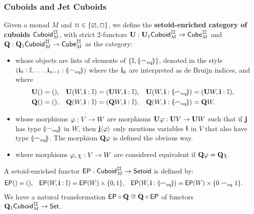 \documentclass[a4paper]{memoir}
\begin{document}
\subsubsection{Cuboids and Jet Cuboids}
\label{sec:cuboid}
\label{sec:jetcuboid}
\begin{definition}
	\label{def:cuboid}
	\label{def:cuboid-ep}
	Given a monad $M$ and $\mycubex \in \accol{\cartes, \affine}$, we define the \textbf{setoid-enriched category of cuboids $\cuboidcat^\mycubex_M$}, with strict 2-functors $\setoidfget : \setoidfget_1\cuboidcat^\mycubex_M \to \cubecat^\mycubex_M$ and $\setoidquot : \setoidquot_1\cuboidcat^\mycubex_M \to \cubecat^\mycubex_M$ as the category:
	\begin{itemize}
		\item whose objects are lists of elements of $\mathopen{}\left\{ {\mathbb I}, {\llparenthesis {\frown}_{\mathrm{eq}} \rrparenthesis} \right\}\mathclose{}$, denoted in the style $(\mathbf{i}_0 : {\mathbb I}, \ldots, \mathbf{i}_{n-1} : {\llparenthesis {\frown}_{\mathrm{eq}} \rrparenthesis})$ where the $\mathbf{i}_k$ are interpreted as de Bruijn indices, and where
		\begin{align*}
			{\mathbf{U}}() &= (), &
			{\mathbf{U}} (W, \mathbf{i} : {\mathbb I}) &= ({\mathbf{U}} W, \mathbf{i} : {\mathbb I}), &
			{\mathbf{U}} (W, \mathbf{i} : {\llparenthesis {\frown}_{\mathrm{eq}} \rrparenthesis}) &= ({\mathbf{U}} W, \mathbf{i} : {\mathbb I}),
			\\
			{\mathbf{Q}} () &= (), &
			{\mathbf{Q}} (W, \mathbf{i} : {\mathbb I}) &= ({\mathbf{Q}} W, \mathbf{i} : {\mathbb I}), &
			{\mathbf{Q}} (W, \mathbf{i} : {\llparenthesis {\frown}_{\mathrm{eq}} \rrparenthesis}) &= {\mathbf{Q}} W.
		\end{align*}
		\item whose morphisms $\varphi : V \to W$ are morphisms ${\mathbf{U}} \varphi : {\mathbf{U}} V \to {\mathbf{U}} W$ such that if $\mathbf{j}$ has type ${\llparenthesis {\frown}_{\mathrm{eq}} \rrparenthesis}$ in $W$, then $\mathbf{j} \langle \varphi \rangle$ only mentions variables $\mathbf{i}$ in $V$ that also have type ${\llparenthesis {\frown}_{\mathrm{eq}} \rrparenthesis}$.
		The morphism ${\mathbf{Q}} \varphi$ is defined the obvious way.
		\item where morphisms $\varphi, \chi : V \to W$ are considered equivalent if ${\mathbf{Q}} \varphi = {\mathbf{Q}} \chi$.
	\end{itemize}
	A setoid-enriched functor $\EP : \cuboidcat^\mycubex_M \to \Setoid$ is defined by:
	\begin{align*}
		\mathsf{EP}() &= (), &
		\mathsf{EP}(W, \mathbf{i} : {\mathbb I}) &= \mathsf{EP}(W) \times \mathopen{}\left\{ 0, 1 \right\}\mathclose{}, &
		\mathsf{EP}(W, \mathbf{i} : {\llparenthesis {\frown}_{\mathrm{eq}} \rrparenthesis}) &= \mathsf{EP}(W) \times \mathopen{}\left\{ 0 \frown_{\mathrm{eq}} 1 \right\}\mathclose{}.
	\end{align*}
	We have a natural transformation $\mathsf{EP} \circ {\mathbf{Q}} \cong {\mathbf{Q}} \circ \mathsf{EP}$ of functors $\setoidquot_1 \cuboidcat^\mycubex_M \to \Set$.
\end{definition}
\end{document}
